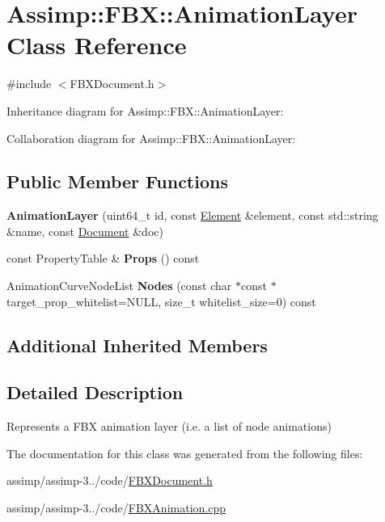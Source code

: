 \hypertarget{class_assimp_1_1_f_b_x_1_1_animation_layer}{\section{Assimp\+:\+:F\+B\+X\+:\+:Animation\+Layer Class Reference}
\label{class_assimp_1_1_f_b_x_1_1_animation_layer}
}


{\ttfamily \#include $<$F\+B\+X\+Document.\+h$>$}



Inheritance diagram for Assimp\+:\+:F\+B\+X\+:\+:Animation\+Layer\+:


Collaboration diagram for Assimp\+:\+:F\+B\+X\+:\+:Animation\+Layer\+:
\subsection*{Public Member Functions}
\begin{DoxyCompactItemize}
\item 
\hypertarget{class_assimp_1_1_f_b_x_1_1_animation_layer_ac8672de8d98e933b283ef3059e7b4ce9}{{\bfseries Animation\+Layer} (uint64\+\_\+t id, const \hyperlink{class_assimp_1_1_f_b_x_1_1_element}{Element} \&element, const std\+::string \&name, const \hyperlink{class_assimp_1_1_f_b_x_1_1_document}{Document} \&doc)}\label{class_assimp_1_1_f_b_x_1_1_animation_layer_ac8672de8d98e933b283ef3059e7b4ce9}

\item 
\hypertarget{class_assimp_1_1_f_b_x_1_1_animation_layer_a5813de179d2a638b64cade932dabb9cd}{const Property\+Table \& {\bfseries Props} () const }\label{class_assimp_1_1_f_b_x_1_1_animation_layer_a5813de179d2a638b64cade932dabb9cd}

\item 
\hypertarget{class_assimp_1_1_f_b_x_1_1_animation_layer_a773cc9ce3e6f6178d37d0a9ff3ec94d1}{Animation\+Curve\+Node\+List {\bfseries Nodes} (const char $\ast$const $\ast$target\+\_\+prop\+\_\+whitelist=N\+U\+L\+L, size\+\_\+t whitelist\+\_\+size=0) const }\label{class_assimp_1_1_f_b_x_1_1_animation_layer_a773cc9ce3e6f6178d37d0a9ff3ec94d1}

\end{DoxyCompactItemize}
\subsection*{Additional Inherited Members}


\subsection{Detailed Description}
Represents a F\+B\+X animation layer (i.\+e. a list of node animations) 

The documentation for this class was generated from the following files\+:\begin{DoxyCompactItemize}
\item 
assimp/assimp-\/3../code/\hyperlink{_f_b_x_document_8h}{F\+B\+X\+Document.\+h}\item 
assimp/assimp-\/3../code/\hyperlink{_f_b_x_animation_8cpp}{F\+B\+X\+Animation.\+cpp}\end{DoxyCompactItemize}
